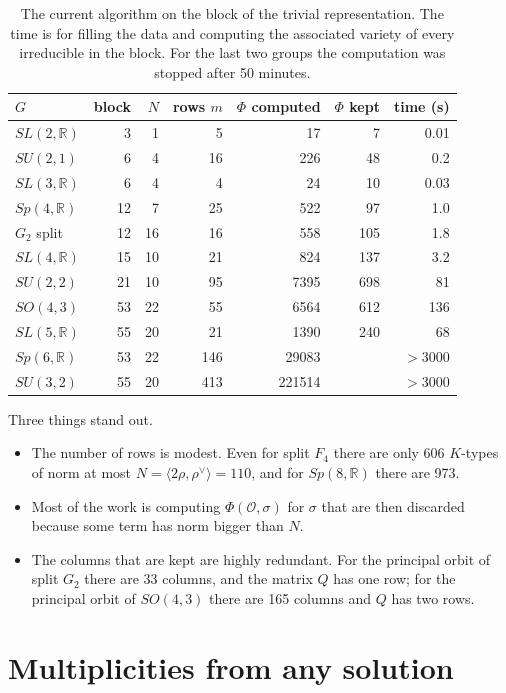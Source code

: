 \documentclass[11pt,leqno]{article}
\theoremstyle{definition}
\numberwithin{equation}{section}
\newcommand{\Ob}{\mathcal O}
\newcommand{\R}{\mathbb R}
\newcommand{\ch}[1]{#1^\vee}
\begin{document}
\begin{table}[ht]
\centering
\begin{tabular}{lrrrrrr}
\toprule
$G$ & block & $N$ & rows $m$ & $\Phi$ computed & $\Phi$ kept & time (s)\\
\midrule
$SL(2,\R)$ & 3 & 1 & 5 & 17 & 7 & 0.01\\
$SU(2,1)$ & 6 & 4 & 16 & 226 & 48 & 0.2\\
$SL(3,\R)$ & 6 & 4 & 4 & 24 & 10 & 0.03\\
$Sp(4,\R)$ & 12 & 7 & 25 & 522 & 97 & 1.0\\
$G_2$ split & 12 & 16 & 16 & 558 & 105 & 1.8\\
$SL(4,\R)$ & 15 & 10 & 21 & 824 & 137 & 3.2\\
$SU(2,2)$ & 21 & 10 & 95 & 7395 & 698 & 81\\
$SO(4,3)$ & 53 & 22 & 55 & 6564 & 612 & 136\\
$SL(5,\R)$ & 55 & 20 & 21 & 1390 & 240 & 68\\
$Sp(6,\R)$ & 53 & 22 & 146 & 29083 &  & $>3000$\\
$SU(3,2)$ & 55 & 20 & 413 & 221514 &  & $>3000$\\
\bottomrule
\end{tabular}
\caption{The current algorithm on the block of the trivial representation.
The time is for filling the data and computing the associated variety of
every irreducible in the block. For the last two groups the computation was
stopped after 50 minutes.}
\label{tab:old}
\end{table}

Three things stand out.

\begin{itemize}
\item The number of rows is modest.  Even for split $F_4$ there are only 606
$K$-types of norm at most $N=\langle 2\rho,\ch\rho\rangle=110$, and for
$Sp(8,\R)$ there are 973.
\item Most of the work is computing $\Phi(\Ob,\sigma)$ for $\sigma$ that are
then discarded because some term has norm bigger than $N$.
\item The columns that are kept are highly redundant.  For the principal orbit
of split $G_2$ there are 33 columns, and the matrix $Q$ has one row; for the
principal orbit of $SO(4,3)$ there are 165 columns and $Q$ has two rows.
\end{itemize}

\section{Multiplicities from any solution}
\label{s:mult}
\end{document}
